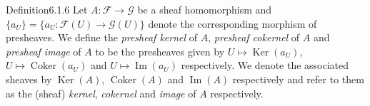 \begin{originaltheorem}{Definition}{6.1.6}
Let $A:\mathcal F\to\mathcal G$ be a sheaf homomorphism and $\{a_U\}=\{a_U:\mathcal F(U)\to\mathcal G(U)\}$ denote the corresponding morphism of presheaves. We define the \emph{presheaf kernel} of $A$, \emph{presheaf cokernel} of $A$ and \emph{presheaf image} of $A$ to be the presheaves given by $U\mapsto\operatorname{Ker}(a_U)$, $U\mapsto\operatorname{Coker}(a_U)$ and $U\mapsto\operatorname{Im}(a_U)$ respectively. We denote the associated sheaves by $\operatorname{Ker}(A)$, $\operatorname{Coker}(A)$ and $\operatorname{Im}(A)$ respectively and refer to them as the (sheaf) \emph{kernel}, \emph{cokernel} and \emph{image} of $A$ respectively.
\end{originaltheorem}

